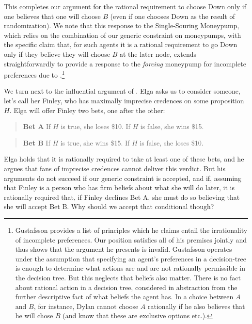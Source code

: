 \documentclass[
  11pt,
  letterpaper]{article}
\begin{document}
This completes our argument for the rational requirement to choose Down only if one believes that one will choose $B$ (even if one chooses Down as the result of randomization). We note that this response to the Single-Souring Moneypump, which relies on the combination of our generic constraint on moneypumps, with the specific claim that, for such agents it is a rational requirement to go Down only if they believe they will choose $B$ at the later node, extends straightforwardly to provide a response to the \emph{forcing} moneypump for incomplete preferences due to \citet[p. 34-9]{Gustafsson2022}.\footnote{Gustafsson provides a list of principles which he claims entail the irrationality of incomplete preferences. Our position satisfies all of his premises jointly and thus shows that the argument he presents is invalid. Gustafsson operates under the assumption that specifying an agent's preferences in a decision-tree is enough to determine what actions are and are not rationally permissible in the decision tree. But this neglects that beliefs also matter. There is no fact about rational action in a decision tree, considered in abstraction from the further descriptive fact of what beliefs the agent has. In a choice between $A$ and $B$, for instance, Dylan cannot choose $A$ rationally if he also believes that he will chose $B$ (and know that these are exclusive options etc.).}

We turn next to the influential argument of \citet{Elga2010}. Elga asks us to consider someone, let's call her Finley, who has maximally imprecise credences on some proposition $H$. Elga will offer Finley two bets, one after the other:

\begin{quote}\textbf{Bet A} If $H$ is true, she loses \$10. If $H$ is false, she wins \$15.\end{quote}

\begin{quote}\textbf{Bet B} If $H$ is true, she wins \$15. If $H$ is false, she loses \$10.\end{quote}

Elga holds that it is rationally required to take at least one of these bets, and he argues that fans of imprecise credences cannot deliver this verdict. But his arguments do not succeed if our generic constraint is accepted, and if, assuming that Finley is a person who has firm beliefs about what she will do later, it is rationally required that, if Finley declines Bet A, she must do so believing that she will accept Bet B. Why should we accept that conditional though?
\end{document}
